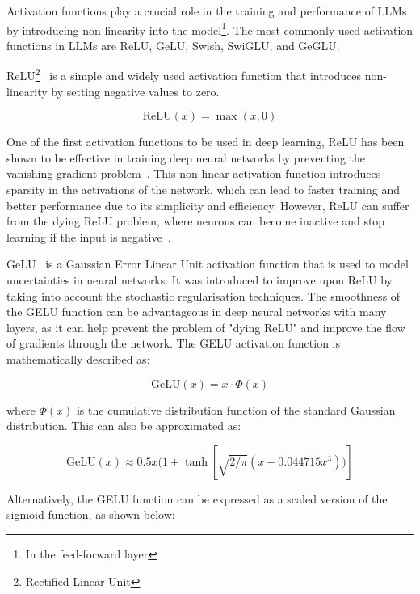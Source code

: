 Activation functions play a crucial role in the training and performance of LLMs by introducing non-linearity into the model\footnote{In the feed-forward layer}.
The most commonly used activation functions in LLMs are ReLU, GeLU, Swish, SwiGLU, and GeGLU\@.

ReLU\footnote{Rectified Linear Unit}~\cite{nair2010rectified} is a simple and widely used activation function that introduces non-linearity by setting negative values to zero.

\begin{equation}
	\text{ReLU}(x) = \max(x, 0)
	\label{eq:relu}
\end{equation}

One of the first activation functions to be used in deep learning, ReLU has been shown to be effective in training deep neural networks by preventing the vanishing gradient problem~\cite{glorot2011deep}.
This non-linear activation function introduces sparsity in the activations of the network, which can lead to faster training and better performance due to its simplicity and efficiency.
However, ReLU can suffer from the dying ReLU problem, where neurons can become inactive and stop learning if the input is negative~\cite{maas2013rectifier}.

GeLU~\cite{hendrycks2016gaussian} is a Gaussian Error Linear Unit activation function that is used to model uncertainties in neural networks.
It was introduced to improve upon ReLU by taking into account the stochastic regularisation techniques.
The smoothness of the GELU function can be advantageous in deep neural networks with many layers, as it can help prevent the problem of "dying ReLU" and improve the flow of gradients through the network.
The GELU activation function is mathematically described as:

\begin{equation}
	\text{GeLU}(x) = x \cdot \Phi(x)
	\label{eq:geluf}
\end{equation}

\noindent where \(\Phi(x)\) is the cumulative distribution function of the standard Gaussian distribution.
This can also be approximated as:

\begin{equation}
	\text{GeLU}(x) \approx 0.5x(1 + \tanh[\sqrt{2/\pi}(x + 0.044715x^3))]
	\label{eq:geluapprox1}
\end{equation}

Alternatively, the GELU function can be expressed as a scaled version of the sigmoid function, as shown below:

